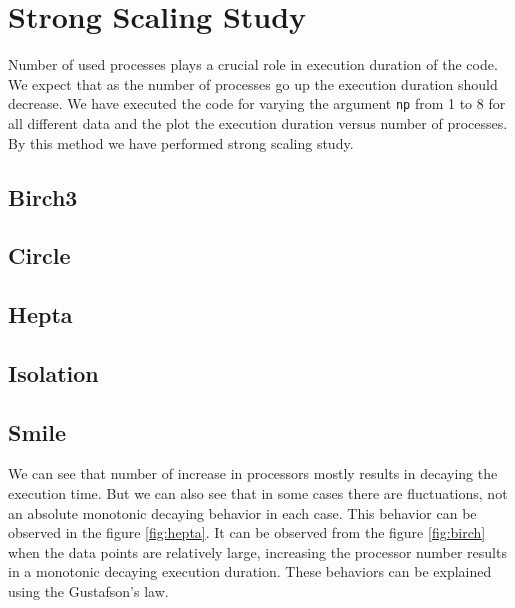 \section{Strong Scaling Study}
Number of used processes plays a crucial role in execution duration of the code. We expect that as the number of processes go up the execution duration should decrease. We have executed the code for varying the argument  \texttt{np} from 1 to 8 for all different data and the plot the execution duration versus number of processes. By this method we have performed strong scaling study.

\subsection{Birch3}


\subsection{Circle}


\subsection{Hepta}


\subsection{Isolation}


\subsection{Smile}


We can see that number of increase in processors mostly results in decaying the execution time. But we can also see that in some cases there are fluctuations, not an absolute monotonic decaying behavior in each case.  This behavior can be observed in the figure \ref{fig:hepta}. It can be observed from the figure \ref{fig:birch} when the data points are relatively large, increasing the processor number results in a monotonic decaying execution duration. These behaviors can be explained using the Gustafson’s law.


